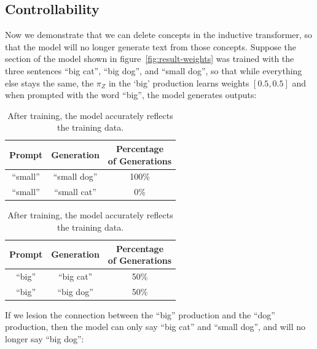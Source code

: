\documentclass{article}
\begin{document}
\subsection{Controllability}

Now we demonstrate that we can delete concepts in the inductive transformer, so that the model will no longer generate text from those concepts. Suppose the section of the model shown in figure~\ref{fig:result-weights} was trained with the three sentences ``big cat'', ``big dog'', and ``small dog'', so that while everything else stays the same, the $\pi_Z$ in the `big' production learns weights $[0.5, 0.5]$ and when prompted with the word ``big'', the model generates outputs:

\begin{table}[H]
\begin{center}
\begin{tabular}{ccc}
\hline\hline
Prompt & Generation &  \thead{Percentage \\ of Generations} \\[1ex]
\hline\hline
``small'' & ``small dog'' & 100\% \\
``small'' & ``small cat'' & 0\% \\
\hline
\end{tabular}
\quad\quad\quad
\begin{tabular}{ccc}
\hline\hline
Prompt & Generation &  \thead{Percentage \\ of Generations} \\[1ex]
\hline
``big'' & ``big cat'' & 50\% \\
``big'' & ``big dog'' & 50\% \\
\hline
\end{tabular}
\caption{After training, the model accurately reflects the training data.}
\end{center}
\end{table}

If we lesion the connection between the ``big'' production and the ``dog'' production, then the model can only say ``big cat'' and ``small dog'', and will no longer say ``big dog'':
\end{document}
